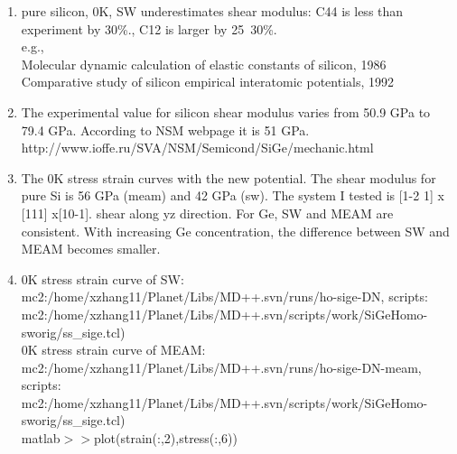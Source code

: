 \documentclass[review]{elsarticle}
\begin{document}
\begin{enumerate}
\item  pure silicon, 0K, SW underestimates shear modulus: C44 is less than experiment by 30\%., C12 is larger by 25~30\%.  \\

e.g., \\
Molecular dynamic calculation of elastic constants of silicon, 1986
Comparative study of silicon empirical interatomic potentials, 1992

\item  The experimental value for silicon shear modulus varies from 50.9 GPa to 79.4 GPa. According to NSM webpage it is 51 GPa. 
http://www.ioffe.ru/SVA/NSM/Semicond/SiGe/mechanic.html 

\item The 0K stress strain curves with the new potential. The shear modulus for pure Si is 56 GPa (meam) and 42 GPa (sw). The system I tested is [1-2 1] x [111] x[10-1]. shear along yz direction. For Ge, SW and MEAM are consistent. With increasing Ge concentration, the difference between SW and MEAM becomes smaller.

\item 0K stress strain curve of SW: mc2:/home/xzhang11/Planet/Libs/MD++.svn/runs/ho-sige-DN, scripts: mc2:/home/xzhang11/Planet/Libs/MD++.svn/scripts/work/SiGeHomo-sworig/ss\_sige.tcl) \\
0K stress strain curve of MEAM:  mc2:/home/xzhang11/Planet/Libs/MD++.svn/runs/ho-sige-DN-meam, scripts: mc2:/home/xzhang11/Planet/Libs/MD++.svn/scripts/work/SiGeHomo-sworig/ss\_sige.tcl) \\
matlab$>>$plot(strain(:,2),stress(:,6))
\end{enumerate} 
\fi 

\end{document}
